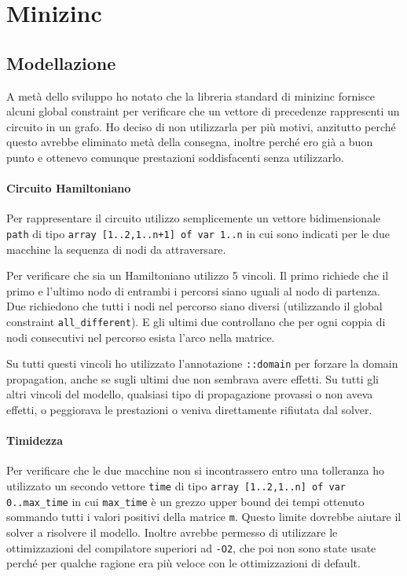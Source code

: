 \documentclass[12pt, a4paper]{article}
\begin{document}
\section{Minizinc}

\subsection{Modellazione}

A metà dello sviluppo ho notato che la libreria standard di minizinc fornisce alcuni global constraint per verificare che un vettore di precedenze rappresenti un circuito in un grafo. Ho deciso di non utilizzarla per più motivi, anzitutto perché questo avrebbe eliminato metà della consegna, inoltre perché ero già a buon punto e ottenevo comunque prestazioni soddisfacenti senza utilizzarlo.

\paragraph{Circuito Hamiltoniano}
Per rappresentare il circuito utilizzo semplicemente un vettore bidimensionale \lstinline{path} di tipo \lstinline{array [1..2,1..n+1] of var 1..n} in cui sono indicati per le due macchine la sequenza di nodi da attraversare.

Per verificare che sia un Hamiltoniano utilizzo 5 vincoli. Il primo richiede che il primo e l'ultimo nodo di entrambi i percorsi siano uguali al nodo di partenza.
Due richiedono che tutti i nodi nel percorso siano diversi (utilizzando il global constraint \lstinline{all_different}). E gli ultimi due controllano che per ogni coppia di nodi consecutivi nel percorso esista l'arco nella matrice.

Su tutti questi vincoli ho utilizzato l'annotazione \lstinline{::domain} per forzare la domain propagation, anche se sugli ultimi due non sembrava avere effetti. Su tutti gli altri vincoli del modello, qualsiasi tipo di propagazione provassi o non aveva effetti, o peggiorava le prestazioni o veniva direttamente rifiutata dal solver.

\paragraph{Timidezza}
Per verificare che le due macchine non si incontrassero entro una tolleranza ho utilizzato un secondo vettore \lstinline{time} di tipo \lstinline{array [1..2,1..n] of var 0..max_time} in cui \lstinline{max_time} è un grezzo upper bound dei tempi ottenuto sommando tutti i valori positivi della matrice \lstinline{m}.
Questo limite dovrebbe aiutare il solver a risolvere il modello. Inoltre avrebbe permesso di utilizzare le ottimizzazioni del compilatore superiori ad \lstinline{-O2}, che poi non sono state usate perché per qualche ragione era più veloce con le ottimizzazioni di default.
\end{document}
